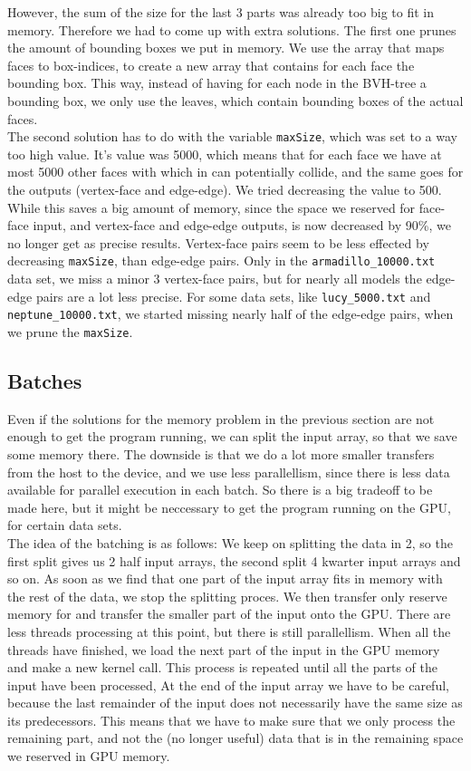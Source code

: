 However, the sum of the size for the last 3 parts was already too big to fit in memory. Therefore we had to come up with extra solutions. The first one prunes the amount of bounding boxes we put in memory. We use the array that maps faces to box-indices, to create a new array that contains for each face the bounding box. This way, instead of having for each node in the BVH-tree a bounding box, we only use the leaves, which contain bounding boxes of the actual faces.\\

The second solution has to do with the variable \texttt{maxSize}, which was set to a way too high value. It's value was 5000, which means that for each face we have at most 5000 other faces with which in can potentially collide, and the same goes for the outputs (vertex-face and edge-edge). We tried decreasing the value to 500. While this saves a big amount of memory, since the space we reserved for face-face input, and vertex-face and edge-edge outputs, is now decreased by 90\%, we no longer get as precise results. Vertex-face pairs seem to be less effected by decreasing \texttt{maxSize}, than edge-edge pairs. Only in the \texttt{armadillo\_10000.txt} data set, we miss a minor 3 vertex-face pairs, but for nearly all models the edge-edge pairs are a lot less precise. For some data sets, like \texttt{lucy\_5000.txt} and \texttt{neptune\_10000.txt}, we started missing nearly half of the edge-edge pairs, when we prune the \texttt{maxSize}.

\subsection{Batches}
Even if the solutions for the memory problem in the previous section are not enough to get the program running, we can split the input array, so that we save some memory there. The downside is that we do a lot more smaller transfers from the host to the device, and we use less parallellism, since there is less data available for parallel execution in each batch. So there is a big tradeoff to be made here, but it might be neccessary to get the program running on the GPU, for certain data sets.\\

The idea of the batching is as follows: We keep on splitting the data in 2, so the first split gives us 2 half input arrays, the second split 4 kwarter input arrays and so on. As soon as we find that one part of the input array fits in memory with the rest of the data, we stop the splitting proces. We then transfer only reserve memory for and transfer the smaller part of the input onto the GPU. There are less threads processing at this point, but there is still parallellism. When all the threads have finished, we load the next part of the input in the GPU memory and make a new kernel call. This process is repeated until all the parts of the input have been processed, At the end of the input array we have to be careful, because the last remainder of the input does not necessarily have the same size as its predecessors. This means that we have to make sure that we only process the remaining part, and not the (no longer useful) data that is in the remaining space we reserved in GPU memory.

